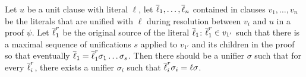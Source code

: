 \begin{property}
\label{prop:rootpair}
Let $u$ be a unit clause with literal $\ell$, let $\overline{\ell}_1,\ldots,\overline{\ell}_n$ contained in clauses $v_1,\ldots,v_n$ be the literals that are unified with $\ell$ during resolution between $v_i$ and $u$ in a proof $\psi$. Let $\overline{\ell}_1^r$ be the original source of the literal $\overline{\ell}_1$: $\overline{\ell}_1^r\in v_{1'}$ such that there is a maximal sequence of unifications $s$ applied to $v_{1'}$ and its children in the proof so that eventually $\overline{\ell}_1=\overline{\ell}_1^r\sigma_1\ldots\sigma_s$.
Then there should be a unifier $\sigma$ such that for every $\overline{\ell}_i^r$, there exists a unifier $\sigma_{i}$ such that $\overline{\ell}_i^r\sigma_i=\ell\sigma$.
\end{property}

